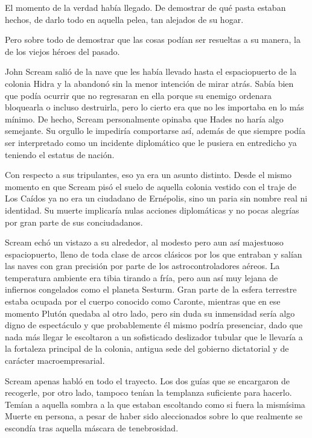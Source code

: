 El momento de la verdad había llegado. De demostrar de qué pasta estaban hechos, de darlo todo en aquella pelea, tan alejados de su hogar.

Pero sobre todo de demostrar que las cosas podían ser resueltas a su manera, la de los viejos héroes del pasado.

\fancyparbreak
John Scream salió de la nave que les había llevado hasta el espaciopuerto de la colonia Hidra y la abandonó sin la menor intención de mirar atrás. Sabía bien que podía ocurrir que no regresaran en ella porque su enemigo ordenara bloquearla o incluso destruirla, pero lo cierto era que no les importaba en lo más mínimo. De hecho, Scream personalmente opinaba que Hades no haría algo semejante. Su orgullo le impediría comportarse así, además de que siempre podía ser interpretado como un incidente diplomático que le pusiera en entredicho ya teniendo el estatus de nación.

Con respecto a sus tripulantes, eso ya era un asunto distinto. Desde el mismo momento en que Scream pisó el suelo de aquella colonia vestido con el traje de Los Caídos ya no era un ciudadano de Ernépolis, sino un paria sin nombre real ni identidad. Su muerte implicaría nulas acciones diplomáticas y no pocas alegrías por gran parte de sus conciudadanos.

Scream echó un vistazo a su alrededor, al modesto pero aun así majestuoso espaciopuerto, lleno de toda clase de arcos clásicos por los que entraban y salían las naves con gran precisión por parte de los astrocontroladores aéreos. La temperatura ambiente era tibia tirando a fría, pero aun así muy lejana de infiernos congelados como el planeta Sesturm. Gran parte de la esfera terrestre estaba ocupada por el cuerpo conocido como Caronte, mientras que en ese momento Plutón quedaba al otro lado, pero sin duda su inmensidad sería algo digno de espectáculo y que probablemente él mismo podría presenciar, dado que nada más llegar le escoltaron a un sofisticado deslizador tubular que le llevaría a la fortaleza principal de la colonia, antigua sede del gobierno dictatorial y de carácter macroempresarial.

Scream apenas habló en todo el trayecto. Los dos guías que se encargaron de recogerle, por otro lado, tampoco tenían la templanza suficiente para hacerlo. Temían a aquella sombra a la que estaban escoltando como si fuera la mismísima Muerte en persona, a pesar de haber sido aleccionados sobre lo que realmente se escondía tras aquella máscara de tenebrosidad.

